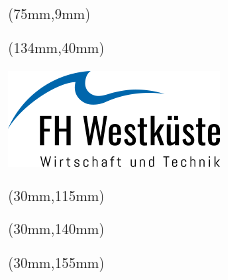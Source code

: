 %
%

\thispagestyle{empty}
\begin{titlepage}
{\selectfont

  \hfuzz=20pt
\begin{textblock*}{\textwidth}(75mm,9mm)
  \begin{minipage}[b][0cm][b]{\textwidth}
  \hfuzz=20pt
  \fontsize{16pt}{16pt}
  \selectfont
    \begin{flushleft}
    	  \IthesisNDAFull
    \end{flushleft}
  \end{minipage}
\end{textblock*}

\begin{textblock*}{\textwidth}(134mm,40mm)
  \begin{minipage}[b][0cm][b]{\textwidth}
    \includegraphics[scale=1]{../style/fhw_logo}
  \end{minipage}
\end{textblock*}

\begin{textblock*}{\textwidth}(30mm,115mm)
  \begin{minipage}[b][0cm][b]{\textwidth}
    \fontsize{22pt}{20pt}
    \selectfont
  	\begin{flushright}
      \IthesisKind
  	\end{flushright}
  \end{minipage}
\end{textblock*}

\begin{textblock*}{\textwidth}(30mm,140mm)
  \begin{minipage}[b][0cm][b]{\textwidth}
  \fontsize{14pt}{20pt}
  \selectfont
    \begin{flushright}
      \IthesisAuthor
  	\end{flushright}
  \end{minipage}
\end{textblock*}

\begin{textblock*}{\textwidth}(30mm,155mm)
  \begin{minipage}[b][0cm][t]{\textwidth}
  \ITitleFontSize
  \selectfont
  	\begin{flushright}
       \IthesisTitle
  	\end{flushright}
  \end{minipage}
\end{textblock*}

}
\end{titlepage}
